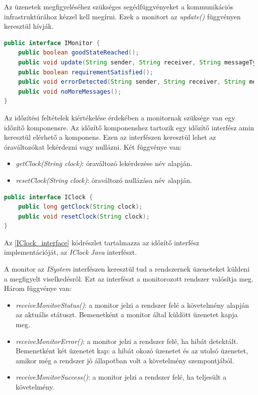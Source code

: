 Az üzenetek megfigyeléséhez szükséges segédfüggvényeket a kommunikációs infrastruktúrához kézzel kell megírni.
Ezek a monitort az \textit{update()} függvényen keresztül hívják.

\begin{lstlisting}[language=java,frame=single, float=h!, caption={Monitor interfész \textit{Java} implementációja.},captionpos=b,label=IMonitor_interface]
public interface IMonitor {
	public boolean goodStateReached();
	public void update(String sender, String receiver, String messageType, Map<String, Object> parameters);
	public boolean requirementSatisfied();
	public void errorDetected(String sender, String receiver, String messageType, Map<String, Object> parameters);
	public void noMoreMessages();
}
\end{lstlisting}

Az időzítési feltételek kiértékelése érdekében a monitornak szüksége van egy időzítő komponensre.
Az időzítő komponenshez tartozik egy időzítő interfész amin keresztül elérhető a komponens.
Ezen az interfészen keresztül lehet az óraváltozókat lekérdezni vagy nullázni.
Két függvénye van:

\begin{itemize}
    \item \textit{getClock(String clock)}: óraváltozó lekérdezése név alapján.
    \item \textit{resetClock(String clock)}: óraváltozó nullázása név alapján.
\end{itemize}

\begin{lstlisting}[language=java,frame=single, float=h!, caption={Időzitő interfész \textit{Java} implementációja.},captionpos=b,label=IClock_interface]
public interface IClock {
	public long getClock(String clock);
	public void resetClock(String clock);
}
\end{lstlisting}

Az \ref{IClock_interface} kódrészlet tartalmazza az időzítő interfész implementációját, az \textit{IClock} \textit{Java} interfészt.

A monitor az \textit{ISystem} interfészen keresztül tud a rendszernek üzeneteket küldeni a megfigyelt viselkedésről.
Ezt az interfészt a monitorozott rendszer valósítja meg.
Három függvénye van:
\begin{itemize}
	\item \textit{receiveMonitorStatus()}: a monitor jelzi a rendszer felé a követelmény alapján az aktuális státuszt.
	Bemenetként a monitor által küldött üzenetet kapja meg.
	\item \textit{receiveMonitorError()}: a monitor jelzi a rendszer felé, ha hibát detektált.
	Bemenetként két üzenetet kap: a hibát okozó üzenetet és az utolsó üzenetet, amikor még a rendszer jó állapotban volt a követelmény szempontjából.
	\item \textit{receiveMonitorSuccess()}: a monitor jelzi a rendszer felé, ha teljesült a követelmény.
\end{itemize}

